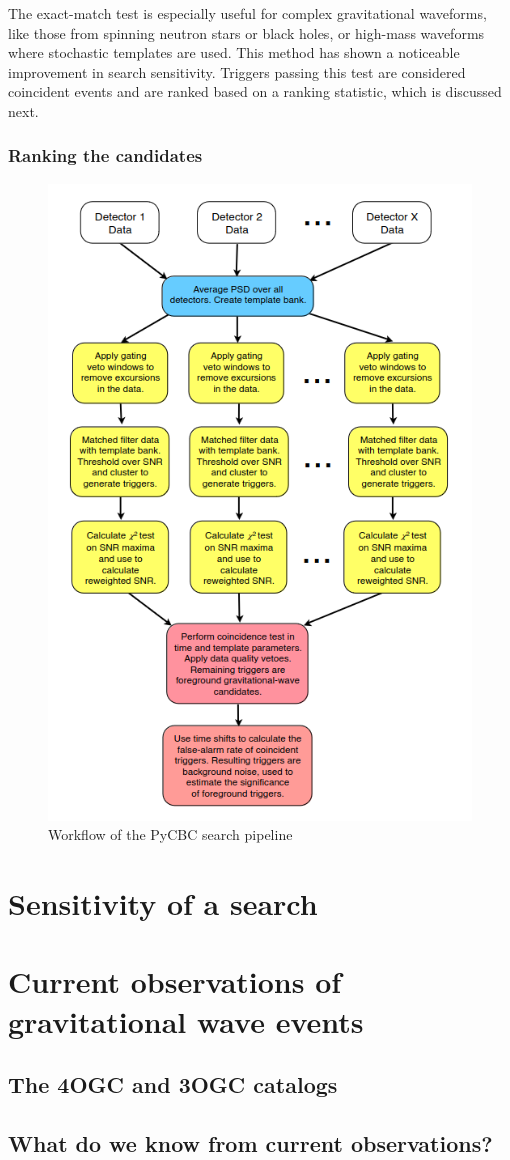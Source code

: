 The exact-match test is especially useful for complex gravitational waveforms, like those from spinning neutron stars or black holes, or high-mass waveforms where stochastic templates are used. This method has shown a noticeable improvement in search sensitivity. Triggers passing this test are considered coincident events and are ranked based on a ranking statistic, which is discussed next.

\subsubsection{Ranking the candidates}


\begin{figure}
    \centering
    \includegraphics[width=0.75\linewidth]{search_workflow.png}
    \caption{Workflow of the PyCBC search pipeline}
    \label{fig:pycbc_search_workflow}
\end{figure}




\section{Sensitivity of a search}


\section{Current observations of gravitational wave events}
\subsection{The 4OGC and 3OGC catalogs}
\subsection{What do we know from current observations?  }


